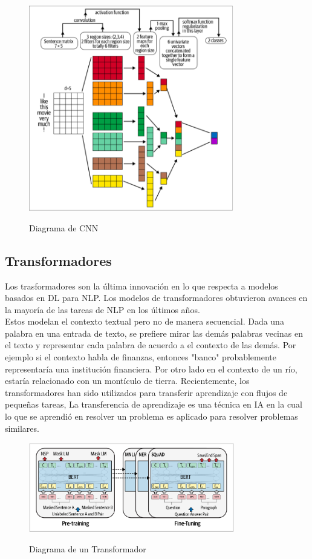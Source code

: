 \begin{figure}[H]
	\centering
	\includegraphics[width=0.8\textwidth]{imagenes/Cap 2/cnn.png}
	\caption{Diagrama de CNN}
	\label{fig:CNN}
	\cite{sowmya_practical_npl}
\end{figure}

\subsection{Transformadores}

Los trasformadores son la última innovación en lo que respecta a modelos basados en DL para NLP.
Los
modelos de transformadores obtuvieron avances en la mayoría de las tareas de NLP en los últimos
años. \\
Estos modelan el contexto textual pero no de manera secuencial. Dada una palabra en una entrada de
texto, se
prefiere mirar las demás palabras vecinas en el texto y representar cada palabra de acuerdo a el
contexto
de las demás. Por ejemplo si el contexto habla de finanzas, entonces "banco" probablemente
representaría una
institución financiera. Por otro lado en el contexto de un río, estaría relacionado con un
montículo de tierra.
Recientemente, los transformadores han sido utilizados para transferir aprendizaje con flujos de
pequeñas tareas,
La transferencia de aprendizaje es una técnica en IA en la cual lo que se aprendió en resolver un
problema es
aplicado para resolver problemas similares.

\begin{figure}[H]
	\centering
	\includegraphics[width=0.8\textwidth]{imagenes/Cap 2/tranformers.png}
	\caption{Diagrama de un Transformador}
	\label{fig:Transformadores}
	\cite{sowmya_practical_npl}
\end{figure}

